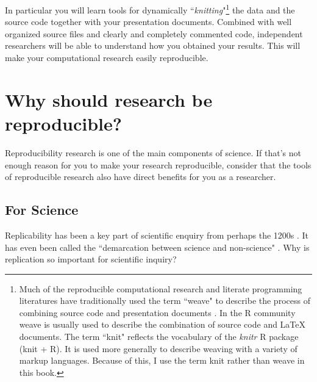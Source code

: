 In particular you will learn tools for dynamically ``{\emph{knitting}}"\footnote{Much of the reproducible computational research and literate programming literatures have traditionally used the term ``weave" to describe the process of combining source code and presentation documents \cite[see][101]{Knuth1992}. In the R community weave is usually used to describe the combination of source code and LaTeX documents. The term ``knit" reflects the vocabulary of the {\emph{knitr}} R package (knit + R). It is used more generally to describe weaving with a variety of markup languages. Because of this, I use the term knit rather than weave in this book.} the data and the source code together with your presentation documents. Combined with well organized source files and clearly and completely commented code, independent researchers will be able to understand how you obtained your results. This will make your computational research easily reproducible.


\section{Why should research be reproducible?}

Reproducibility research is one of the main components of science. If that's not enough reason for you to make your research reproducible, consider that the tools of reproducible research also have direct benefits for you as a researcher. 

\subsection{For Science}

Replicability has been a key part of scientific enquiry from perhaps the 1200s \cite[]{Bacon1267,Nosek2012}. It has even been called the ``demarcation between science and non-science" \cite[2]{Braude1979}. Why is replication so important for scientific inquiry? 

